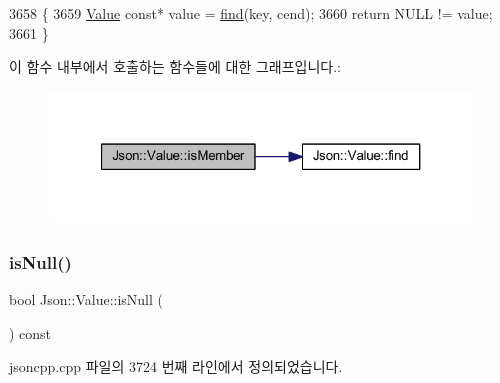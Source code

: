 \begin{DoxyCode}
3658 \{
3659   \hyperlink{class_json_1_1_value}{Value} \textcolor{keyword}{const}* value = \hyperlink{class_json_1_1_value_afb007b9ce9b2cf9d5f667a07e5e0349f}{find}(key, cend);
3660   \textcolor{keywordflow}{return} NULL != value;
3661 \}
\end{DoxyCode}
이 함수 내부에서 호출하는 함수들에 대한 그래프입니다.\+:\nopagebreak
\begin{figure}[H]
\begin{center}
\leavevmode
\includegraphics[width=321pt]{class_json_1_1_value_a2007e1e51f21f44ecf1f13e4a1c567b9_cgraph}
\end{center}
\end{figure}
\mbox{\label{class_json_1_1_value_abde4070e21e46dc4f8203f66582cb19f}} 
\subsubsection{\texorpdfstring{is\+Null()}{isNull()}}
{\footnotesize\ttfamily bool Json\+::\+Value\+::is\+Null (\begin{DoxyParamCaption}{ }\end{DoxyParamCaption}) const}



jsoncpp.\+cpp 파일의 3724 번째 라인에서 정의되었습니다.


